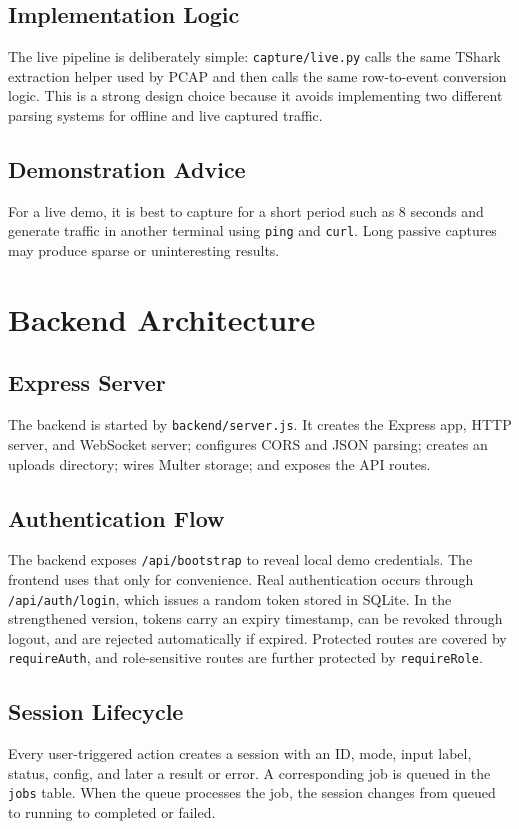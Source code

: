 \documentclass[12pt,a4paper]{report}
\begin{document}
\section{Implementation Logic}
The live pipeline is deliberately simple: \texttt{capture/live.py} calls the same TShark extraction helper used by PCAP and then calls the same row-to-event conversion logic. This is a strong design choice because it avoids implementing two different parsing systems for offline and live captured traffic.

\section{Demonstration Advice}
For a live demo, it is best to capture for a short period such as 8 seconds and generate traffic in another terminal using \texttt{ping} and \texttt{curl}. Long passive captures may produce sparse or uninteresting results.

\chapter{Backend Architecture}
\section{Express Server}
The backend is started by \texttt{backend/server.js}. It creates the Express app, HTTP server, and WebSocket server; configures CORS and JSON parsing; creates an uploads directory; wires Multer storage; and exposes the API routes.

\section{Authentication Flow}
The backend exposes \texttt{/api/bootstrap} to reveal local demo credentials. The frontend uses that only for convenience. Real authentication occurs through \texttt{/api/auth/login}, which issues a random token stored in SQLite. In the strengthened version, tokens carry an expiry timestamp, can be revoked through logout, and are rejected automatically if expired. Protected routes are covered by \texttt{requireAuth}, and role-sensitive routes are further protected by \texttt{requireRole}.

\section{Session Lifecycle}
Every user-triggered action creates a session with an ID, mode, input label, status, config, and later a result or error. A corresponding job is queued in the \texttt{jobs} table. When the queue processes the job, the session changes from queued to running to completed or failed.
\end{document}
